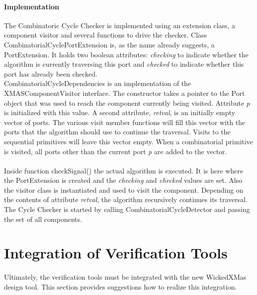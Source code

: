 \documentclass[a4paper,11pt]{article}
\begin{document}
\paragraph{Implementation}
The Combinatoric Cycle Checker is implemented using an extension class, a component visitor
and several functions to drive the checker. Class CombinatorialCyclePortExtension is, as
the name already suggests, a PortExtension. It holds two boolean attributes: \emph{checking} to
indicate whether the algorithm is currently traversing this port and \emph{checked} to indicate
whether this port has already been checked.\\
CombinatorialCycleDependencies is an implementation of the XMASComponentVisitor interface.
The constructor takes a pointer to the Port object that was used to reach the component
currently being visited. Attribute \emph{p} is initialized with this value. A second attribute,
\emph{retval}, is an initially empty vector of ports. The various visit member functions will
fill this vector with the ports that the algorithm should use to continue the traversal. Visits
to the sequential primitives will leave this vector empty. When a combinatorial primitive is
visited, all ports other than the current port \emph{p} are added to the vector.

\paragraph{}
Inside function checkSignal() the actual algorithm is executed. It is here where the PortExtension
is created and the \emph{checking} and \emph{checked} values are set. Also the visitor class
is instantiated and used to visit the component. Depending on the contents of attribute
\emph{retval}, the algorithm recursively continues its traversal. The Cycle Checker is started
by calling CombinatorialCycleDetector and passing the set of all components.


\section{Integration of Verification Tools}

\paragraph{}
Ultimately, the verification tools must be integrated with the new WickedXMas design tool.
This section provides suggestions how to realize this integration.
\end{document}
